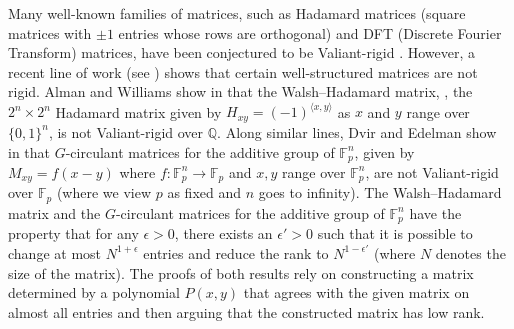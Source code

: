 \documentclass{toc}
\newcommand\F{{\mathbb{F}}}
\renewcommand\Q{{\mathbb{Q}}}
\begin{document}
Many well-known families of matrices, such as Hadamard matrices
(square matrices with $\pm 1$ entries whose rows are orthogonal) and DFT
(Discrete Fourier Transform)  matrices, have been conjectured to be 
Valiant-rigid \cite{survey}.  However, a recent line of work
(see \cite{old_hadamard, CLP}) shows that certain well-structured matrices
are not rigid.  Alman and Williams show in \cite{old_hadamard} that the
Walsh--Hadamard matrix, \ie, the $2^n \times 2^n$ Hadamard matrix given by 
$H_{xy} = (-1)^{\langle x , y \rangle}$ 
as $x$ and $y$ range over $\{ 0,1 \}^n$, is not Valiant-rigid over $\Q$.
Along similar lines, Dvir and Edelman show in \cite{CLP} that 
$G$-circulant matrices for the additive group of
$\F_p^n$, given by $M_{xy} = f(x-y)$ where $f: \F_p^n \rightarrow \F_p$ and $x,y$ range over $\F_p^n$, are not Valiant-rigid over $\F_p$ (where we view $p$ as fixed and $n$ goes to infinity).  The Walsh--Hadamard 
matrix and the $G$-circulant matrices for the additive group of  
$\F_p^n$ have 
the property that for any $\epsilon > 0$, there exists an $\epsilon'>0$ such that it is possible to change at most $N^{1 + \epsilon}$ entries and reduce the rank to $N^{1 - \epsilon'}$ (where $N$ denotes the size of the matrix).  The proofs of both results rely on constructing a matrix determined by a polynomial $P(x,y)$ that agrees with the given matrix on almost all entries and then arguing that the constructed matrix has low rank.   
\end{document}
